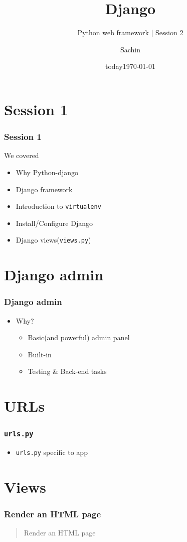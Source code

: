 \documentclass[bigger, presentation]{beamer}
\date{today}
\subtitle{Python web framework | Session 2}
\institute{Indian Institute of Technology Bombay}
\title{Django}
\author{Sachin}
\date{\today}
\begin{document}
\maketitle

\section{Session 1}
\label{sec-1}
\begin{frame}
\frametitle{Session 1}
\label{sec-1-1}

   We covered
   
\begin{itemize}
\item Why Python-django
\item Django framework
\item Introduction to \texttt{virtualenv}
\item Install/Configure Django
\item Django views(\texttt{views.py})
\end{itemize}
\end{frame}
\section{Django admin}
\label{sec-2}
\begin{frame}
\frametitle{Django admin}
\label{sec-2-1}

\begin{itemize}
\item Why?
\begin{itemize}
\item Basic(and powerful) admin panel
\item Built-in
\item Testing \& Back-end tasks
\end{itemize}
\end{itemize}
\end{frame}
\section{URLs}
\label{sec-3}
\begin{frame}
\frametitle{\texttt{urls.py}}
\label{sec-3-1}

\begin{itemize}
\item \texttt{urls.py} specific to app
\end{itemize}
\end{frame}
\section{Views}
\label{sec-4}
\begin{frame}
\frametitle{Render an HTML page}
\label{sec-4-1}


\begin{quote}
Render an HTML page
\end{quote}

  
\end{frame}
\end{document}
